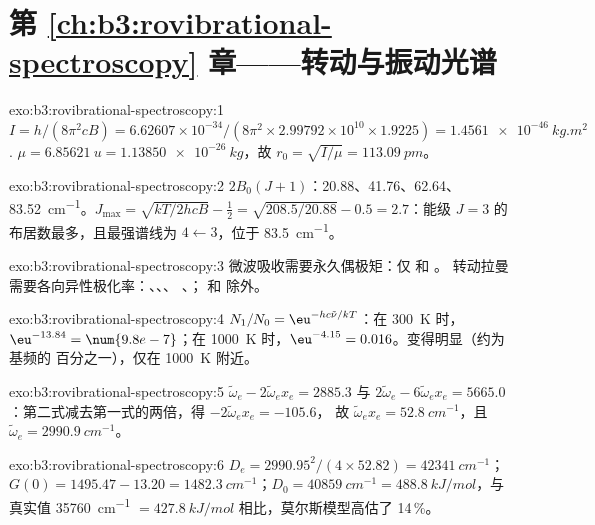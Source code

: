 \section*{第 \ref{ch:b3:rovibrational-spectroscopy} 章——转动与振动光谱}

\begin{solution}{exo:b3:rovibrational-spectroscopy:1}
$I = h/(8\pi^2cB) = 6.62607 \times 10^{-34}/(8\pi^2 \times 2.99792 \times 10^{10} \times
1.9225) = \qty{1.4561e-46}{kg.m^2}$. $\mu = \qty{6.85621}{u} = \qty{1.13850e-26}{kg}$，故
$r_0 = \sqrt{I/\mu} = \qty{113.09}{pm}$。
\end{solution}

\begin{solution}{exo:b3:rovibrational-spectroscopy:2}
$2B_0(J+1)$：20.88、41.76、62.64、\qty{83.52}{cm^{-1}}。$J_{\max} = \sqrt{kT/2hcB} -
\frac12 = \sqrt{208.5/20.88} - 0.5 = 2.7$：能级 $J = 3$ 的
布居数最多，且最强谱线为 $4 \leftarrow 3$，位于 \qty{83.5}{cm^{-1}}。
\end{solution}

\begin{solution}{exo:b3:rovibrational-spectroscopy:3}
微波吸收需要永久偶极矩：仅  和 。
转动拉曼需要各向异性极化率：、、、
、；  和  除外。
\end{solution}

\begin{solution}{exo:b3:rovibrational-spectroscopy:4}
$N_1/N_0 = \eu^{-hc\tilde\nu/kT}$：在 \qty{300}{K} 时，$\eu^{-13.84} = \num{9.8e-7}$；在
\qty{1000}{K} 时，$\eu^{-4.15} = 0.016$。变得明显（约为基频的
百分之一），仅在 \qty{1000}{K} 附近。
\end{solution}

\begin{solution}{exo:b3:rovibrational-spectroscopy:5}
$\tilde\omega_e - 2\tilde\omega_ex_e = 2885.3$ 与 $2\tilde\omega_e - 6\tilde\omega_ex_e =
5665.0$：第二式减去第一式的两倍，得 $-2\tilde\omega_ex_e = -105.6$，
故 $\tilde\omega_ex_e = \qty{52.8}{cm^{-1}}$，且 $\tilde\omega_e = \qty{2990.9}{cm^{-1}}$。
\end{solution}

\begin{solution}{exo:b3:rovibrational-spectroscopy:6}
$D_e = 2990.95^2/(4 \times 52.82) = \qty{42341}{cm^{-1}}$；$G(0) = 1495.47 - 13.20 =
\qty{1482.3}{cm^{-1}}$；$D_0 = \qty{40859}{cm^{-1}} = \qty{488.8}{kJ/mol}$，与真实值
\qty{35760}{cm^{-1}} $= \qty{427.8}{kJ/mol}$ 相比，莫尔斯模型高估了 14\,\%。
\end{solution}

